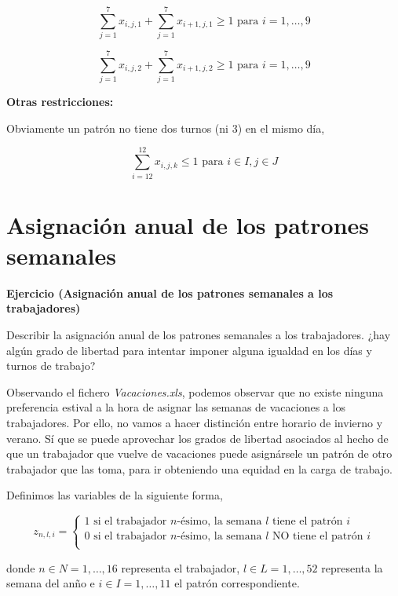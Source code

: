 \documentclass[a4paper,12pt]{article}
\newenvironment{exercise}[1]%
{%
  \par\vspace{\baselineskip}\noindent
  \textbf{Ejercicio (#1)}\begin{itshape}%
  \par\vspace{\baselineskip}\noindent\ignorespaces
}%
{%
  \end{itshape}\ignorespacesafterend
}
\begin{document}
$$ \sum_{j=1}^{7} x_{i,j,1} + \sum_{j=1}^{7} x_{i+1,j,1} \geq 1 \text{ para } i=1,\dots,9$$

$$ \sum_{j=1}^{7} x_{i,j,2} + \sum_{j=1}^{7} x_{i+1,j,2} \geq 1 \text{ para } i=1,\dots,9$$


\textbf{Otras restricciones:} 

Obviamente un patr\'on no tiene dos turnos (ni 3) en el mismo d\'ia,

$$ \sum_{i=12}^{12} x_{i,j,k} \leq 1 \text{ para } i\in I, j\in J$$



\section{Asignaci\'on anual de los patrones semanales}
\begin{exercise}{Asignaci\'on anual de los patrones semanales a los trabajadores}

Describir la asignaci\'on anual de los patrones semanales a los trabajadores. ¿hay alg\'un grado de libertad para intentar imponer alguna igualdad en los d\'ias y turnos de trabajo?\\

\end{exercise}

Observando el fichero \textit{Vacaciones.xls}, podemos observar que no existe ninguna preferencia estival a la hora de asignar las semanas de vacaciones a los trabajadores. Por ello, no vamos a hacer distinci\'on entre horario de invierno y verano. S\'i que se puede aprovechar los grados de libertad asociados al hecho de que un trabajador que vuelve de vacaciones puede asign\'arsele un patr\'on de otro trabajador que las toma, para ir obteniendo una equidad en la carga de trabajo. 

Definimos las variables de la siguiente forma,
	
	\begin{equation*}
	z_{n,l,i} = \left\lbrace \begin{array}{l}
		1 \text{ si el trabajador } n\text{-\'esimo, la semana } l \text{ tiene el patr\'on } i \\
     	0 \text{ si el trabajador } n\text{-\'esimo, la semana } l \text{ NO tiene el patr\'on } i \\

	\end{array}
	\right. 
	\end{equation*}
	
donde $n\in N = {1,\dots,16}$ representa el trabajador, $l\in L={1,\dots,52}$ representa la semana del an\~no e $i\in I = {1,\dots,11}$ el patr\'on correspondiente.\\
\end{document}
